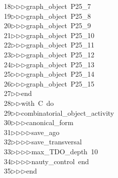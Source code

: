 \begin{tabbing}
18\>$\triangleright$\>$\triangleright$\>$\triangleright$\>graph\_object\ P25\_7\ \\[0pt]
19\>$\triangleright$\>$\triangleright$\>$\triangleright$\>graph\_object\ P25\_8\ \\[0pt]
20\>$\triangleright$\>$\triangleright$\>$\triangleright$\>graph\_object\ P25\_9\ \\[0pt]
21\>$\triangleright$\>$\triangleright$\>$\triangleright$\>graph\_object\ P25\_10\ \\[0pt]
22\>$\triangleright$\>$\triangleright$\>$\triangleright$\>graph\_object\ P25\_11\ \\[0pt]
23\>$\triangleright$\>$\triangleright$\>$\triangleright$\>graph\_object\ P25\_12\ \\[0pt]
24\>$\triangleright$\>$\triangleright$\>$\triangleright$\>graph\_object\ P25\_13\ \\[0pt]
25\>$\triangleright$\>$\triangleright$\>$\triangleright$\>graph\_object\ P25\_14\ \\[0pt]
26\>$\triangleright$\>$\triangleright$\>$\triangleright$\>graph\_object\ P25\_15\ \\[0pt]
27\>$\triangleright$\>$\triangleright$\>end\ \\[0pt]
28\>$\triangleright$\>$\triangleright$\>with\ C\ do\ \\[0pt]
29\>$\triangleright$\>$\triangleright$\>combinatorial\_object\_activity\ \\[0pt]
30\>$\triangleright$\>$\triangleright$\>$\triangleright$\>canonical\_form\ \\[0pt]
31\>$\triangleright$\>$\triangleright$\>$\triangleright$\>$\triangleright$\>save\_ago\ \\[0pt]
32\>$\triangleright$\>$\triangleright$\>$\triangleright$\>$\triangleright$\>save\_transversal\ \\[0pt]
33\>$\triangleright$\>$\triangleright$\>$\triangleright$\>$\triangleright$\>max\_TDO\_depth\ 10\ \\[0pt]
34\>$\triangleright$\>$\triangleright$\>$\triangleright$\>$\triangleright$\>nauty\_control\ end\ \\[0pt]
35\>$\triangleright$\>$\triangleright$\>$\triangleright$\>end\ \\[0pt]

\end{tabbing}
